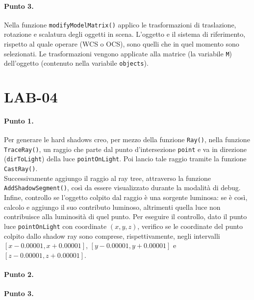 \documentclass[a4paper, 12pt]{article}
\begin{document}
\paragraph{Punto 3.}
Nella funzione \texttt{modifyModelMatrix()} applico le trasformazioni di traslazione, rotazione e scalatura degli oggetti in scena. L'oggetto e il sistema di riferimento, rispetto al quale operare (WCS o OCS), sono quelli che in quel momento sono selezionati. Le trasformazioni vengono applicate alla matrice (la variabile \texttt{M}) dell'oggetto (contenuto nella variabile \texttt{objects}).


\section{LAB-04}

\paragraph{Punto 1.}
Per generare le hard shadows creo, per mezzo della funzione \texttt{Ray()}, nella funzione \texttt{TraceRay()}, un raggio che parte dal punto d'intersezione \texttt{point} e va in direzione (\texttt{dirToLight}) della luce \texttt{pointOnLight}. Poi lancio tale raggio tramite la funzione \texttt{CastRay()}.\\
Successivamente aggiungo il raggio al ray tree, attraverso la funzione \texttt{ \allowbreak AddShadowSegment()}, così da essere visualizzato durante la modalità di debug.\\
Infine, controllo se l'oggetto colpito dal raggio è una sorgente luminosa: se è così, calcolo e aggiungo il suo contributo luminoso, altrimenti quella luce non contribuisce alla luminosità di quel punto. Per eseguire il controllo, dato il punto luce \texttt{pointOnLight} con coordinate $(x, y, z)$, verifico se le coordinate del punto colpito dallo shadow ray sono comprese, rispettivamente, negli intervalli $[x - 0.00001, x + 0.00001]$, $[y - 0.00001, y + 0.00001]$ e $[z - 0.00001, z + 0.00001]$.

\paragraph{Punto 2.}
\paragraph{Punto 3.}


\end{document}
